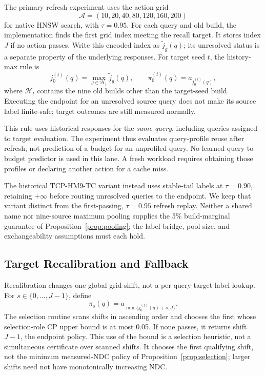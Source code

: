 The primary refresh experiment uses the action grid
\begin{equation}
 \mathcal{A}=(10,20,40,80,120,160,200)
 \label{eq:tcp-grid}
\end{equation}
for native HNSW search, with $\tau=0.95$. For each query and old build, the implementation finds the first grid index meeting the recall target. It stores index $J$ if no action passes. Write this encoded index as $\tilde j_g(q)$; its unresolved status is a separate property of the underlying responses. For target seed $t$, the history-max rule is
\begin{equation}
 j_0^{(t)}(q)=\max_{g\in\mathcal{H}_t}\tilde j_g(q),\qquad
 \pi_0^{(t)}(q)=a_{j_0^{(t)}(q)},
 \label{eq:history-max}
\end{equation}
where $\mathcal{H}_t$ contains the nine old builds other than the target-seed build. Executing the endpoint for an unresolved source query does not make its source label finite-safe; target outcomes are still measured normally.

This rule uses historical responses for the \emph{same query}, including queries assigned to target evaluation. The experiment thus evaluates query-profile reuse after refresh, not prediction of a budget for an unprofiled query. No learned query-to-budget predictor is used in this lane. A fresh workload requires obtaining those profiles or declaring another action for a cache miss.

The historical TCP-HM9-TC variant instead uses stable-tail labels at $\tau=0.90$, retaining $+\infty$ before routing unresolved queries to the endpoint. We keep that variant distinct from the first-passing, $\tau=0.95$ refresh replay. Neither a shared name nor nine-source maximum pooling supplies the 5\% build-marginal guarantee of Proposition~\ref{prop:pooling}; the label bridge, pool size, and exchangeability assumptions must each hold.

\subsection{Target Recalibration and Fallback}
\label{sec:tcp-recalibration}

Recalibration changes one global grid shift, not a per-query target label lookup. For $s\in\{0,\ldots,J-1\}$, define
\begin{equation}
 \pi_s(q)=a_{\min\{j_0^{(t)}(q)+s,J\}}.
 \label{eq:shift}
\end{equation}
The selection routine scans shifts in ascending order and chooses the first whose selection-role CP upper bound is at most 0.05. If none passes, it returns shift $J-1$, the endpoint policy. This use of the bound is a selection heuristic, not a simultaneous certificate over scanned shifts. It chooses the first qualifying shift, not the minimum measured-NDC policy of Proposition~\ref{prop:selection}; larger shifts need not have monotonically increasing NDC.

